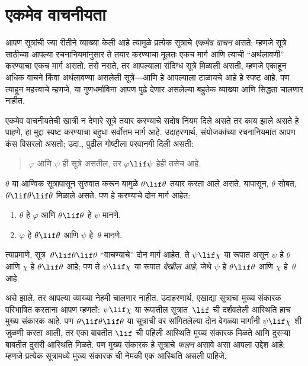 \section{एकमेव वाचनीयता}\label{fol:syn:unq:sec}

\begin{explain}
आपण सूत्रांची ज्या रीतीने व्याख्या केली आहे त्यामुळे प्रत्येक
सूत्राचे \emph{एकमेव वाचन} असते; म्हणजे सूत्रे साठीच्या
आपल्या रचनानियमांनुसार ते तयार करण्याचा मूलतः एकच मार्ग आणि त्याची
``अर्थलावणी'' करण्याचा एकच मार्ग असतो. तसे नसते, तर आपल्याला संदिग्ध
सूत्रे मिळाली असती, म्हणजे एकाहून अधिक वाचने किंवा अर्थलावण्या
असलेली सूत्रे---आणि हे आपल्याला टाळायचे आहे हे स्पष्ट आहे. पण
त्याहून महत्त्वाचे म्हणजे, या गुणधर्माविना आपण पुढे देणार असलेल्या
बहुतेक व्याख्या आणि सिद्धता चालणार नाहीत.

एकमेव वाचनीयतेची खात्री न देणारे सूत्रे तयार करण्याचे सदोष नियम
दिले असते तर काय झाले असते हे पाहणे, हा मुद्दा स्पष्ट करण्याचा बहुधा
सर्वोत्तम मार्ग आहे. उदाहरणार्थ, संयोजकांच्या रचनानियमांत आपण कंस
विसरलो असतो; उदा., पुढील गोष्टीला परवानगी दिली असती:
\begin{quote}
$\varphi$ आणि $\psi$ ही सूत्रे असतील, तर $\varphi \lif \psi$ हेही तसेच आहे.
\end{quote}
$\theta$ या आण्विक सूत्रापासून सुरुवात करून यामुळे $\theta \lif \theta$ तयार करता
आले असते. यापासून, $\theta$ सोबत, $\theta \lif \theta \lif \theta$ मिळाले असते. पण
हे करण्याचे दोन मार्ग आहेत:
\begin{enumerate}
\item $\theta$ हे $\varphi$ आणि $\theta \lif \theta$ हे $\psi$ मानणे.
\item $\varphi$ हे $\theta \lif \theta$ आणि $\psi$ हे~$\theta$ मानणे.
\end{enumerate}
त्याप्रमाणे, सूत्र~$\theta \lif \theta \lif \theta$ ``वाचण्याचे'' दोन मार्ग
आहेत. ते $\psi \lif \chi$ या रूपात असून $\psi$ हे $\theta$ आणि $\chi$ हे $\theta
\lif \theta$ आहे; पण ते $\psi \lif \chi$ या रूपात \emph{देखील आहे}, जेथे $\psi$
हे $\theta \lif \theta$ आणि $\chi$ हे~$\theta$ आहे.

असे झाले, तर आपल्या व्याख्या नेहमी चालणार नाहीत. उदाहरणार्थ, एखाद्या
सूत्राचा मुख्य संकारक परिभाषित करताना आपण म्हणतो: $\psi \lif \chi$
या रूपातील सूत्रात~$\lif$ ची दर्शवलेली आस्थिति हाच मुख्य संकारक
आहे. पण $\theta \lif \theta \lif \theta$ या सूत्राची वर सांगितलेल्या दोन वेगळ्या
मार्गांनी $\psi \lif \chi$ शी जुळणी करता आली, तर एका बाबतीत $\lif$ ची
पहिली आस्थिति मुख्य संकारक मिळते आणि दुसऱ्या बाबतीत दुसरी
आस्थिति मिळते. पण मुख्य संकारक हे सूत्राचे \emph{फलन} असावे
असा आपला उद्देश आहे; म्हणजे प्रत्येक सूत्रामध्ये मुख्य संकारक ची नेमकी एक आस्थिति असली पाहिजे.
\end{explain}

